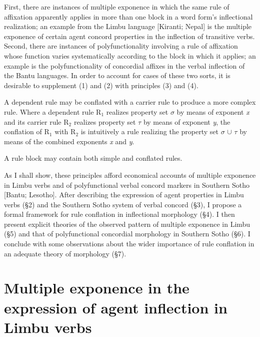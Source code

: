 \documentclass[output=paper,
modfonts
]{LSP/langsci}
\begin{document}
First, there are instances of multiple exponence in which the same rule of affixation apparently applies in more than one block in a word form’s inflectional realization; an example from the Limbu language [Kiranti; Nepal] is the multiple exponence of certain agent concord properties in the inflection of transitive verbs.  Second, there are instances of polyfunctionality involving a rule of affixation whose function varies systematically according to the block in which it applies; an example is the polyfunctionality of concordial affixes in the verbal inflection of the Bantu languages.  In order to account for cases of these two sorts, it is desirable to supplement (1) and (2) with principles (3) and (4).

\ea%
    \label{ex:3}
 A dependent rule may be conflated with a carrier rule to produce a more complex rule.  Where a dependent rule R$_{1}$ realizes property set $\sigma $ by means of exponent \textit{x} and its carrier rule R$_{2}$ realizes property set $\tau $ by means of exponent \textit{y}, the conflation of R$_{1}$ with R$_{2}$ is intuitively a rule realizing the property set $\sigma $ ${\cup}$ $\tau $ by means of the combined exponents \textit{x} and \textit{y}.
\z

\ea%
    \label{ex:4}
   A rule block may contain both simple and conflated rules.
\z

  As I shall show, these principles afford economical accounts of multiple exponence in Limbu verbs and of polyfunctional verbal concord markers in Southern Sotho [Bantu; Lesotho].  After describing the expression of agent properties in Limbu verbs (§2) and the Southern Sotho system of verbal concord (§3), I propose a formal framework for rule conflation in inflectional morphology (§4).  I then present explicit theories of the observed pattern of multiple exponence in Limbu (§5) and that of polyfunctional concordial morphology in Southern Sotho (§6).  I conclude with some observations about the wider importance of rule conflation in an adequate theory of morphology (§7).

\section{Multiple exponence in the expression of agent inflection in Limbu verbs}
\end{document}
